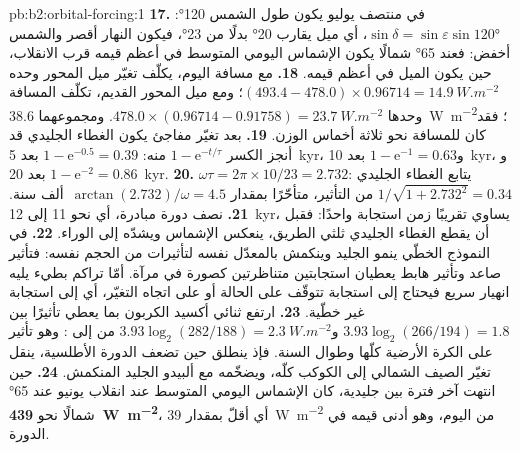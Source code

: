 \begin{solution}{pb:b2:orbital-forcing:1}
\textbf{17.} في منتصف يوليو يكون طول الشمس \ang{120}: $\sin\delta = \sin\varepsilon\sin\ang{120}$،
أي ميل يقارب \ang{20} بدلًا من \ang{23}، فيكون النهار أقصر والشمس أخفض: فعند
\ang{65} شمالًا يكون الإشماس اليومي المتوسط في أعظم قيمه قرب الانقلاب، حين يكون الميل في أعظم قيمه.
\textbf{18.} مع مسافة اليوم، يكلّف تغيّر ميل المحور وحده $(493.4 - 478.0) \times
0.96714 = \qty{14.9}{W.m^{-2}}$؛ ومع ميل المحور القديم، تكلّف المسافة وحدها $478.0 \times
(0.96714 - 0.91758) = \qty{23.7}{W.m^{-2}}$. ومجموعهما \qty{38.6}{W.m^{-2}}؛ فقد كان للمسافة
نحو ثلاثة أخماس الوزن.
\textbf{19.} بعد تغيّر مفاجئ يكون الغطاء الجليدي قد أنجز الكسر $1 - \mathrm e^{-t/\tau}$ منه:
$1 - \mathrm e^{-0.5} = 0.39$ بعد \qty{5}{kyr}، و$1 - \mathrm e^{-1} = 0.63$ بعد \qty{10}{kyr}،
و$1 - \mathrm e^{-2} = 0.86$ بعد \qty{20}{kyr}.
\textbf{20.} $\omega\tau = 2\pi \times 10/23 = 2.732$: يتابع الغطاء الجليدي $1/\sqrt{1 + 2.732^2} =
0.34$ من التأثير، متأخّرًا بمقدار $\arctan(2.732)/\omega = 4.5$~ألف سنة.
\textbf{21.} نصف دورة مبادرة، أي نحو 11 إلى \qty{12}{kyr}، يساوي تقريبًا زمن استجابة واحدًا: فقبل
أن يقطع الغطاء الجليدي ثلثي الطريق، ينعكس الإشماس ويشدّه إلى الوراء.
\textbf{22.} في النموذج الخطّي ينمو الجليد وينكمش بالمعدّل نفسه لتأثيرات من الحجم
نفسه: فتأثير صاعد وتأثير هابط يعطيان استجابتين متناظرتين كصورة في مرآة. أمّا تراكم بطيء يليه
انهيار سريع فيحتاج إلى استجابة تتوقّف على الحالة أو على اتجاه التغيّر، أي إلى
استجابة غير خطّية.
\textbf{23.} ارتفع ثنائي أكسيد الكربون بما يعطي تأثيرًا بين $3.93\log_2(266/194) = 1.8$ و$3.93\log_2(282/188) =
\qty{2.3}{W.m^{-2}}$ من  إلى : وهو تأثير على الكرة الأرضية كلّها وطوال
السنة. فإذ ينطلق حين تضعف الدورة الأطلسية، ينقل تغيّر الصيف
الشمالي إلى الكوكب كلّه، ويضخّمه مع ألبيدو الجليد المنكمش.
\textbf{24.} حين انتهت آخر فترة بين جليدية، كان الإشماس اليومي المتوسط عند انقلاب يونيو عند
\ang{65} شمالًا نحو \textbf{\qty{439}{W.m^{-2}}}، أي أقلّ بمقدار \qty{39}{W.m^{-2}} من اليوم، وهو أدنى
قيمه في الدورة.
\end{solution}
